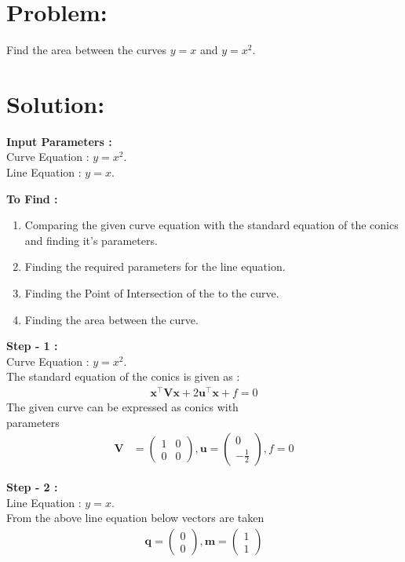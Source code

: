 \documentclass[10pt,a4paper]{report}
\newcommand{\myvec}[1]{\ensuremath{\begin{pmatrix}#1\end{pmatrix}}}
\let\vec\mathbf
\begin{document}
\begin{multicols}{2}

\section{Problem:}  
Find the area between the curves $y=x$ and $y=x^2$.

\section{Solution: }
\raggedright \textbf{Input Parameters :}\\ \vspace{2mm}
\centering Curve Equation : $y=x^2$. \\ \vspace{1mm}
Line Equation : $y=x$.\\
\vspace{3mm}

\raggedright \textbf{To Find :}\\ \vspace{2mm}
\begin{enumerate}
\item Comparing the given curve equation with the standard equation of the conics and finding it's parameters.
\item Finding the required parameters for the line equation.
\item Finding the Point of Intersection of the to the curve.
\item Finding the area between the curve.
\end{enumerate}

\raggedright \textbf{Step - 1 :}\\ \vspace{2mm}
Curve Equation : $y=x^2$. \\ \vspace{1mm}
The standard equation of the conics is given as :
\begin{align}
\vec{x}^{\top}\vec{V}\vec{x}+2\vec{u}^{\top}\vec{x}+f=0
\end{align}
The given curve  can be expressed as conics with \\parameters
\begin{align}
	\vec{V} &= \myvec{1 & 0\\0 & 0}, \vec{u} = \myvec{0 \\-\frac{1}{2}}, f = 0
	\end{align}

\raggedright \textbf{Step - 2 :}\\ \vspace{2mm}
Line Equation : $y=x$. \\ \vspace{1mm}
From the above line equation below vectors are taken
\begin{align}
\vec{q} = \myvec{0 \\0} , \vec{m}=\myvec{1\\1}
\end{align}


\end{multicols}
\end{document}
